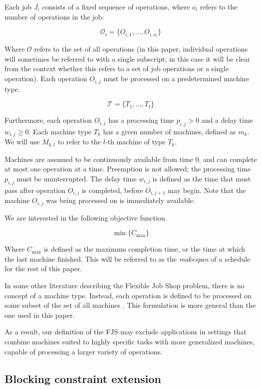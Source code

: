 \documentclass[a4paper,10pt]{article}
\begin{document}
Each job $J_i$ consists of a fixed sequence of operations, where $o_i$ refers to the number of operations in the job:

\[ \mathcal{O}_i = \{O_{i,1}, \dots, O_{i, o_i}\} \]

Where $\mathcal{O}$ refers to the set of all operations (in this paper, individual operations will sometimes be referred to with a single subscript; in this case it will be clear from the context whether this refers to a set of job operations or a single operation). Each operation $O_{i,j}$ must be processed on a predetermined machine type.

\[ \mathcal{T} = \{T_1, \dots, T_t\} \]

Furthermore, each operation $O_{i,j}$ has a processing time $p_{i,j} > 0$ and a delay time $w_{i,j} \geq 0$. Each machine type $T_k$ has a given number of machines, defined as $m_k$. We will use $M_{k,l}$ to refer to the $l$-th machine of type $T_k$.

Machines are assumed to be continuously available from time 0, and can complete at most one operation at a time. Preemption is not allowed; the processing time $p_{i,j}$ must be uninterrupted. The delay time $w_{i,j}$ is defined as the time that must pass after operation $O_{i,j}$ is completed, before $O_{i,j + 1}$ may begin. Note that the machine $O_{i,j}$ was being processed on is immediately available.

We are interested in the following objective function.

\[ \min \{ C_\text{max} \} \]

Where $C_\text{max}$ is defined as the maximum completion time, or the time at which the last machine finished. This will be referred to as the \emph{makespan} of a schedule for the rest of this paper.

In some other literature describing the Flexible Job Shop problem, there is no concept of a machine type. Instead, each operation is defined to be processed on some subset of the set of all machines \cite{approxfjsp, ls-fbjs}. This formulation is more general than the one used in this paper.

As a result, our definition of the FJS may exclude applications in settings that combine machines suited to highly specific tasks with more generalized machines, capable of processing a larger variety of operations.

\subsection{Blocking constraint extension}
\end{document}
